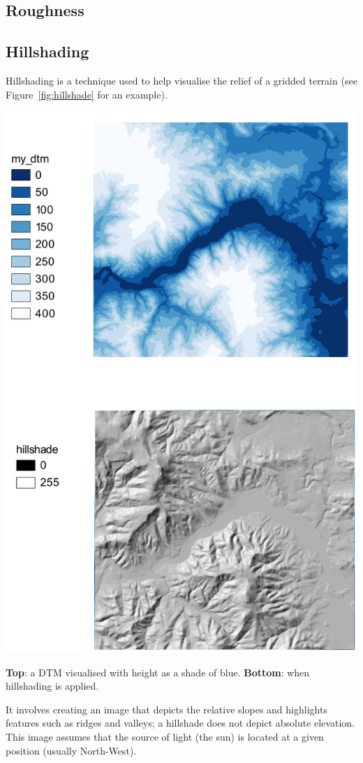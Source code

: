 \subsection{Roughness}%





\subsection{Hillshading}%

Hillshading is a technique used to help visualise the relief of a gridded terrain (see Figure~\ref{fig:hillshade} for an example).
\begin{marginfigure}
  \centering
  \includegraphics[width=\linewidth]{figs/hillshade}
  \caption{\textbf{Top}: a DTM visualised with height as a shade of blue. \textbf{Bottom}: when hillshading is applied.}%
\label{fig:hillshade}
\end{marginfigure}
It involves creating an image that depicts the relative slopes and highlights features such as ridges and valleys; a hillshade does not depict absolute elevation.
This image assumes that the source of light (the sun) is located at a given position (usually North-West).

